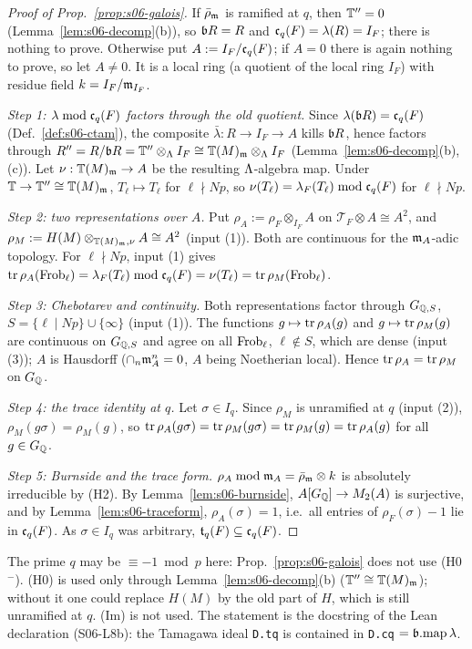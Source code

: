 \begin{proof}[Proof of Prop.~\ref{prop:s06-galois}]
If $\bar\rho_{\mathfrak{m}}$ is ramified at $q$, then $\mathbb{T}''=0$ (Lemma~\ref{lem:s06-decomp}(b)), so $\mathfrak{b} R=R$ and $\mathfrak{c}_q(F)=\lambda(R)=I_F$; there is
nothing to prove. Otherwise put $A:=I_F/\mathfrak{c}_q(F)$; if $A=0$ there is again nothing to prove, so let $A\ne0$. It is a local ring (a
quotient of the local ring $I_F$) with residue field $k=I_F/\mathfrak{m}_{I_F}$.

\emph{Step 1: $\lambda\bmod\mathfrak{c}_q(F)$ factors through the old quotient.} Since $\lambda(\mathfrak{b} R)=\mathfrak{c}_q(F)$ (Def.~\ref{def:s06-ctam}), the
composite $\bar\lambda:R\to I_F\to A$ kills $\mathfrak{b} R$, hence factors through $R''=R/\mathfrak{b} R=\mathbb{T}''\otimes_\Lambda I_F\cong\mathbb{T}(M)_{\mathfrak{m}}\otimes_\Lambda I_F$
(Lemma~\ref{lem:s06-decomp}(b),(c)). Let $\nu:\mathbb{T}(M)_{\mathfrak{m}}\to A$ be the resulting $\Lambda$-algebra map. Under $\mathbb{T}\to\mathbb{T}''\cong\mathbb{T}(M)_{\mathfrak{m}}$, $T_\ell\mapsto T_\ell$
for $\ell\nmid Np$, so $\nu(T_\ell)=\lambda_F(T_\ell)\bmod\mathfrak{c}_q(F)$ for $\ell\nmid Np$.

\emph{Step 2: two representations over $A$.} Put $\rho_A:=\rho_F\otimes_{I_F}A$ on $\mathcal T_F\otimes A\cong A^2$, and
$\rho_M:=H(M)\otimes_{\mathbb{T}(M)_{\mathfrak{m}},\nu}A\cong A^2$ (input (1)). Both are continuous for the $\mathfrak{m}_A$-adic topology. For $\ell\nmid Np$, input (1)
gives $\operatorname{tr}\rho_A(\mathrm{Frob}_\ell)=\lambda_F(T_\ell)\bmod\mathfrak{c}_q(F)=\nu(T_\ell)=\operatorname{tr}\rho_M(\mathrm{Frob}_\ell)$.

\emph{Step 3: Chebotarev and continuity.} Both representations factor through $G_{\mathbb{Q},S}$, $S=\{\ell\mid Np\}\cup\{\infty\}$ (input (1)). The
functions $g\mapsto\operatorname{tr}\rho_A(g)$ and $g\mapsto\operatorname{tr}\rho_M(g)$ are continuous on $G_{\mathbb{Q},S}$ and agree on all $\mathrm{Frob}_\ell$, $\ell\notin S$, which are dense
(input (3)); $A$ is Hausdorff ($\cap_n\mathfrak{m}_A^n=0$, $A$ being Noetherian local). Hence $\operatorname{tr}\rho_A=\operatorname{tr}\rho_M$ on $G_{\mathbb{Q}}$.

\emph{Step 4: the trace identity at $q$.} Let $\sigma\in I_q$. Since $\rho_M$ is unramified at $q$ (input (2)), $\rho_M(g\sigma)=\rho_M(g)$, so
$\operatorname{tr}\rho_A(g\sigma)=\operatorname{tr}\rho_M(g\sigma)=\operatorname{tr}\rho_M(g)=\operatorname{tr}\rho_A(g)$ for all $g\in G_{\mathbb{Q}}$.

\emph{Step 5: Burnside and the trace form.} $\rho_A\bmod\mathfrak{m}_A=\bar\rho_{\mathfrak{m}}\otimes k$ is absolutely irreducible by (H2). By
Lemma~\ref{lem:s06-burnside}, $A[G_{\mathbb{Q}}]\to M_2(A)$ is surjective, and by Lemma~\ref{lem:s06-traceform}, $\rho_A(\sigma)=1$, i.e.\ all entries of
$\rho_F(\sigma)-1$ lie in $\mathfrak{c}_q(F)$. As $\sigma\in I_q$ was arbitrary, $\mathfrak{t}_q(F)\subseteq\mathfrak{c}_q(F)$.
\end{proof}
\noindent The prime $q$ may be $\equiv-1\bmod p$ here: Prop.~\ref{prop:s06-galois} does not use (H0$^-$). (H0) is used only through
Lemma~\ref{lem:s06-decomp}(b) ($\mathbb{T}''\cong\mathbb{T}(M)_{\mathfrak{m}}$); without it one could replace $H(M)$ by the old part of $H$, which is still
unramified at $q$. (Im) is not used. The statement is the docstring of the Lean declaration  (S06-L8b): the
Tamagawa ideal \texttt{D.tq} is contained in \texttt{D.cq} $=\mathfrak{b}.\mathrm{map}\,\lambda$.
